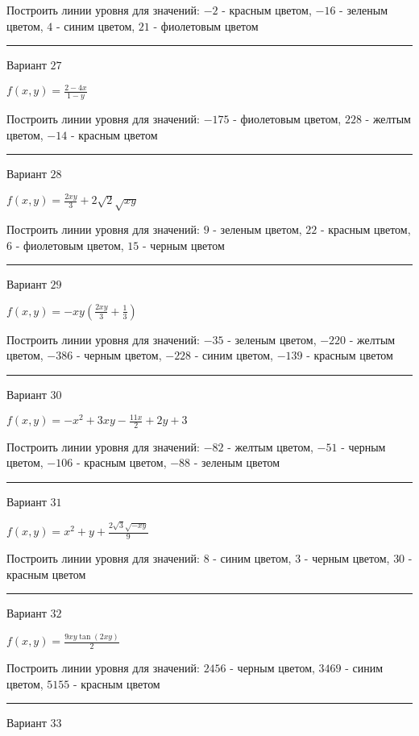 \documentclass[11pt]{report}
\begin{document}
Построить линии уровня для значений: $-2$ - красным цветом, $-16$ - зеленым цветом, $4$ - синим цветом, $21$ - фиолетовым цветом
\begin{center}
\noindent\rule{8cm}{0.4pt}
\end{center}
Вариант $27$


$f(x, y) = \frac{2 - 4 x}{1 - y}$

Построить линии уровня для значений: $-175$ - фиолетовым цветом, $228$ - желтым цветом, $-14$ - красным цветом
\begin{center}
\noindent\rule{8cm}{0.4pt}
\end{center}
Вариант $28$


$f(x, y) = \frac{2 x y}{3} + 2 \sqrt{2} \sqrt{x y}$

Построить линии уровня для значений: $9$ - зеленым цветом, $22$ - красным цветом, $6$ - фиолетовым цветом, $15$ - черным цветом
\begin{center}
\noindent\rule{8cm}{0.4pt}
\end{center}
Вариант $29$


$f(x, y) = - x y \left(\frac{2 x y}{3} + \frac{1}{3}\right)$

Построить линии уровня для значений: $-35$ - зеленым цветом, $-220$ - желтым цветом, $-386$ - черным цветом, $-228$ - синим цветом, $-139$ - красным цветом
\begin{center}
\noindent\rule{8cm}{0.4pt}
\end{center}
Вариант $30$


$f(x, y) = - x^{2} + 3 x y - \frac{11 x}{2} + 2 y + 3$

Построить линии уровня для значений: $-82$ - желтым цветом, $-51$ - черным цветом, $-106$ - красным цветом, $-88$ - зеленым цветом
\begin{center}
\noindent\rule{8cm}{0.4pt}
\end{center}
Вариант $31$


$f(x, y) = x^{2} + y + \frac{2 \sqrt{3} \sqrt{- x y}}{9}$

Построить линии уровня для значений: $8$ - синим цветом, $3$ - черным цветом, $30$ - красным цветом
\begin{center}
\noindent\rule{8cm}{0.4pt}
\end{center}
Вариант $32$


$f(x, y) = \frac{9 x y \tan{\left(2 x y \right)}}{2}$

Построить линии уровня для значений: $2456$ - черным цветом, $3469$ - синим цветом, $5155$ - красным цветом
\begin{center}
\noindent\rule{8cm}{0.4pt}
\end{center}
Вариант $33$
\end{document}
